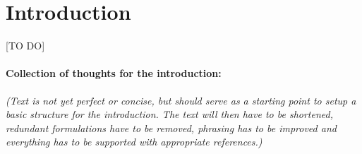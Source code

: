 \documentclass[12pt,preprint]{aastex}
\begin{document}

\tableofcontents

\section{Introduction}

[TO DO]

\paragraph{Collection of thoughts for the introduction:} \textit{(Text is not yet perfect or concise, but should serve as a starting point to setup a basic structure for the introduction. The text will then have to be shortened, redundant formulations have to be removed, phrasing has to be improved and everything has to be supported with appropriate references.)}
\end{document}

